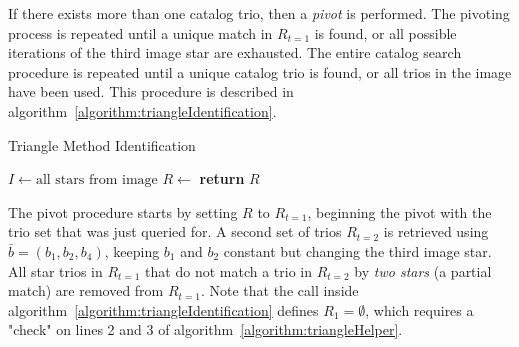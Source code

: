 If there exists more than one catalog trio, then a \textit{pivot} is performed. The pivoting process is repeated until
a unique match in $R_{t=1}$ is found, or all possible iterations of the third image star are exhausted. The entire
catalog search procedure is repeated until a unique catalog trio is found, or all trios in the image have been used.
This procedure is described in algorithm~\autoref{algorithm:triangleIdentification}.

\begin{algorithm}
    \caption{Triangle Method Identification} \label{algorithm:triangleIdentification}
    \begin{algorithmic}[1]
        \State $I \gets \text{all stars} \text{ from image}$
        \State $R \gets$ 
        \State \textbf{return} $R$
        \EndIf
        \EndFor
        \EndFor
        \EndFor
        \EndProcedure
    \end{algorithmic}
\end{algorithm}

The pivot procedure starts by setting $R$ to $R_{t=1}$, beginning the pivot with the trio set that was just queried
for. A second set of trios $R_{t=2}$ is retrieved using $\bar{b} = (b_1, b_2, b_4)$, keeping $b_1$ and $b_2$ constant
but changing the third image star. All star trios in $R_{t=1}$ that do not match a trio in $R_{t=2}$ by
\textit{two stars} (a partial match) are removed from $R_{t=1}$. Note that the  call
inside algorithm~\autoref{algorithm:triangleIdentification} defines $R_1 = \emptyset$, which requires a "check" on
lines 2 and 3 of algorithm~\autoref{algorithm:triangleHelper}.

